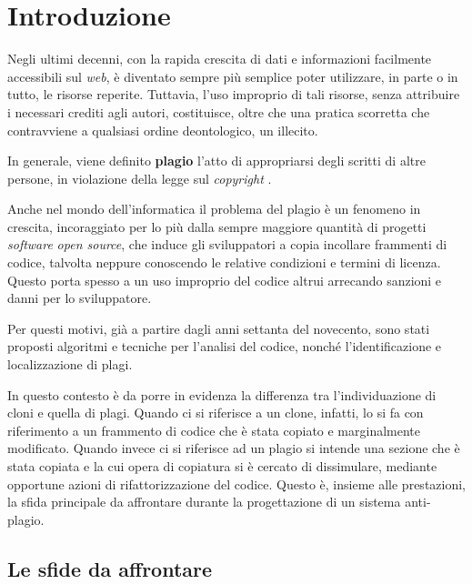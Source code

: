 \chapter{Introduzione}
Negli ultimi decenni, con la rapida crescita di dati e informazioni facilmente accessibili sul \textit{web}, è diventato sempre più semplice poter utilizzare, in parte o in tutto, le risorse reperite.
%
Tuttavia, l'uso improprio di tali risorse, senza attribuire i necessari crediti agli autori, costituisce, oltre che una pratica scorretta che contravviene a qualsiasi ordine deontologico, un illecito. 

In generale, viene definito \textbf{plagio} l'atto di appropriarsi degli scritti di altre persone, in violazione della legge sul \textit{copyright} \cite{britannica}.

Anche nel mondo dell'informatica il problema del plagio è un fenomeno in crescita, incoraggiato per lo più dalla sempre maggiore quantità di progetti \textit{software} \textit{open source}, che induce gli sviluppatori a copia incollare frammenti di codice, talvolta neppure conoscendo le relative condizioni e termini di licenza.
%
Questo porta spesso a un uso improprio del codice altrui arrecando sanzioni e danni per lo sviluppatore.

Per questi motivi, già a partire dagli anni settanta del novecento, sono stati proposti algoritmi e tecniche per l'analisi del codice, nonché l'identificazione e localizzazione di plagi.

In questo contesto è da porre in evidenza la differenza tra l'individuazione di cloni e quella di plagi.
%
Quando ci si riferisce a un clone, infatti, lo si fa con riferimento a un frammento di codice che è stata copiato e marginalmente modificato. 
%
Quando invece ci si riferisce ad un plagio si intende una sezione che è stata copiata e la cui opera di copiatura si è cercato di dissimulare, mediante opportune azioni di rifattorizzazione del codice.  
%
%
Questo è, insieme alle prestazioni, la sfida principale da affrontare durante la progettazione di un sistema anti-plagio.

\section{Le sfide da affrontare}

